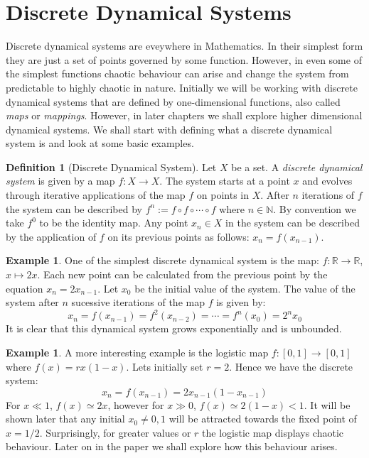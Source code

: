 \documentclass[11pt,a4paper,oneside]{memoir}
\theoremstyle{plain}
\theoremstyle{definition}
\newtheorem{defn}[thm]{Definition}
\newtheorem{exmp}[thm]{Example}
\begin{document}
\section{Discrete Dynamical Systems} \label{sec:dynsys}

Discrete dynamical systems are eveywhere in Mathematics. In their simplest form they are just a set of points governed by some function. However, in even some of the simplest functions chaotic behaviour can arise and change the system from predictable to highly chaotic in nature. Initially we will be working with discrete dynamical systems that are defined by one-dimensional functions, also called \emph{maps} or \emph{mappings}. However, in later chapters we shall explore higher dimensional dynamical systems. We shall start with defining what a discrete dynamical system is and look at some basic examples.

\begin{defn}[Discrete Dynamical System]
    Let $X$ be a set. A \emph{discrete dynamical system} is given by a map $f: X \to X$. The system starts at a point $x$ and evolves through iterative applications of the map $f$ on points in $X$. After $n$ iterations of $f$ the system can be described by $f^n := f \circ f \circ \cdots \circ f$ where $n \in \mathbb{N}$. By convention we take $f^0$ to be the identity map. Any point $x_n \in X$ in the system can be described by the application of $f$ on its previous points as follows: $x_n = f(x_{n-1})$.
\end{defn}

\begin{exmp}
One of the simplest discrete dynamical system is the map: $f: \mathbb{R} \to \mathbb{R}$, $x \mapsto 2x$. Each new point can be calculated from the previous point by the equation $x_n = 2x_{n-1}$. Let $x_0$ be the initial value of the system. The value of the system after $n$ sucessive iterations of the map $f$ is given by: \[x_n = f(x_{n-1}) = f^2(x_{n-2}) = \cdots = f^n(x_0) = 2^nx_0\] It is clear that this dynamical system grows exponentially and is unbounded.
\end{exmp}

\begin{exmp}
    A more interesting example is the logistic map $f: [0,1] \to [0,1]$ where $f(x)=rx(1-x)$. Lets initially set $r = 2$. Hence we have the discrete system: \[x_n = f(x_{n-1}) = 2x_{n-1}(1 - x_{n-1})\] For $x \ll 1$, $f(x) \simeq 2x$, however for $x \gg 0$, $f(x) \simeq 2(1-x) < 1$. It will be shown later that any initial $x_0 \neq 0, 1$ will be attracted towards the fixed point of $x = 1/2$. Surprisingly, for greater values or $r$ the logistic map displays chaotic behaviour. Later on in the paper we shall explore how this behaviour arises.
\end{exmp}
\end{document}
